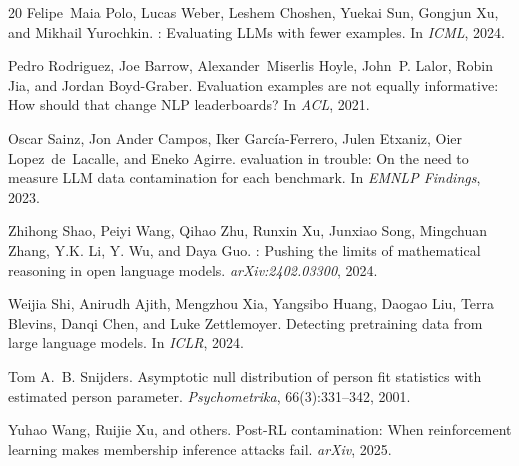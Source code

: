 \documentclass[11pt,a4paper]{article}
\begin{document}
\begin{thebibliography}{20}
Felipe~Maia Polo, Lucas Weber, Leshem Choshen, Yuekai Sun, Gongjun Xu, and Mikhail Yurochkin.
: Evaluating {LLMs} with fewer examples.
\newblock In \emph{ICML}, 2024.

Pedro Rodriguez, Joe Barrow, Alexander~Miserlis Hoyle, John~P. Lalor, Robin Jia, and Jordan Boyd-Graber.
\newblock Evaluation examples are not equally informative: How should that change {NLP} leaderboards?
\newblock In \emph{ACL}, 2021.

Oscar Sainz, Jon Ander Campos, Iker Garc{\'i}a-Ferrero, Julen Etxaniz, Oier Lopez~de~Lacalle, and Eneko Agirre.
 evaluation in trouble: On the need to measure {LLM} data contamination for each benchmark.
\newblock In \emph{EMNLP Findings}, 2023.

Zhihong Shao, Peiyi Wang, Qihao Zhu, Runxin Xu, Junxiao Song, Mingchuan Zhang, Y.K. Li, Y. Wu, and Daya Guo.
: Pushing the limits of mathematical reasoning in open language models.
\newblock \emph{arXiv:2402.03300}, 2024.

Weijia Shi, Anirudh Ajith, Mengzhou Xia, Yangsibo Huang, Daogao Liu, Terra Blevins, Danqi Chen, and Luke Zettlemoyer.
\newblock Detecting pretraining data from large language models.
\newblock In \emph{ICLR}, 2024.

Tom A.~B. Snijders.
\newblock Asymptotic null distribution of person fit statistics with estimated person parameter.
\newblock \emph{Psychometrika}, 66(3):331--342, 2001.

Yuhao Wang, Ruijie Xu, and others.
\newblock Post-{RL} contamination: When reinforcement learning makes membership inference attacks fail.
\newblock \emph{arXiv}, 2025.

\end{thebibliography}
\end{document}
